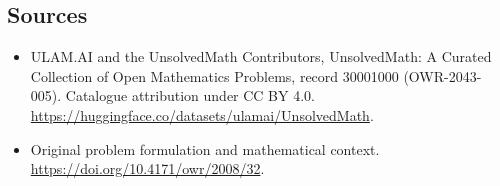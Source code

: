 \documentclass[11pt]{article}
\begin{document}
\subsection{Sources}
\begin{itemize}
\item[\hypertarget{source:30001000:1}{S1}] ULAM.AI and the UnsolvedMath Contributors, UnsolvedMath: A Curated Collection of Open Mathematics Problems, record 30001000 (OWR-2043-005). Catalogue attribution under CC BY 4.0.
\url{https://huggingface.co/datasets/ulamai/UnsolvedMath}.
\item[\hypertarget{source:30001000:2}{S2}] Original problem formulation and mathematical context.
\url{https://doi.org/10.4171/owr/2008/32}.
\end{itemize}
\label{end:30001000}
\end{document}
